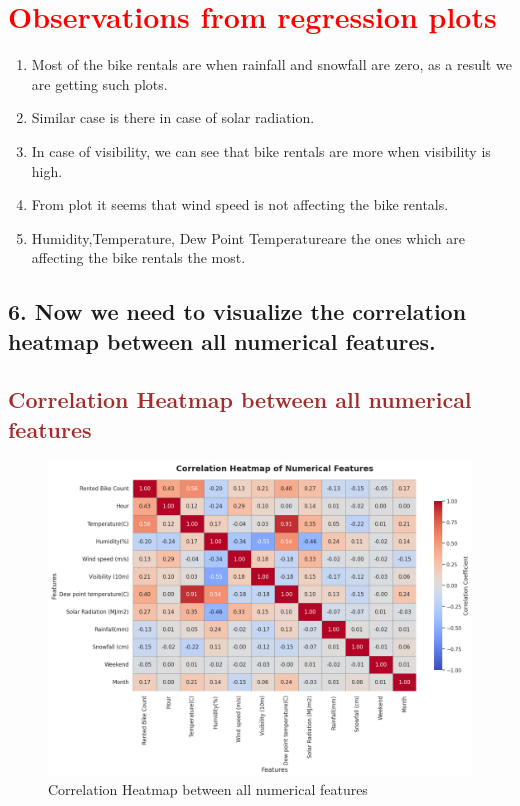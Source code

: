 \documentclass[12pt, letterpaper]{article}
\begin{document}
\newpage

\section*{\textcolor{red}{Observations from regression plots}}

\begin{enumerate}
  \item Most of the bike rentals are when rainfall and snowfall are zero, as a result we are getting such plots.
  \item Similar case is there in case of solar radiation.
  \item In case of visibility, we can see that bike rentals are more when visibility is high.
  \item From plot it seems that wind speed is not affecting the bike rentals.
  \item Humidity,Temperature, Dew Point Temperatureare the ones which are affecting the bike rentals the most.
\end{enumerate}


\bigskip
\bigskip

\subsection*{6. Now we need to visualize the correlation heatmap between all numerical features.}

\newpage

\subsection*{\textcolor{brown}{Correlation Heatmap between all numerical features}}
\begin{figure}[h]
  \centering
  \includegraphics[width=1\textwidth]{heatmap.png}
  \caption{Correlation Heatmap between all numerical features}
\end{figure}
\end{document}
